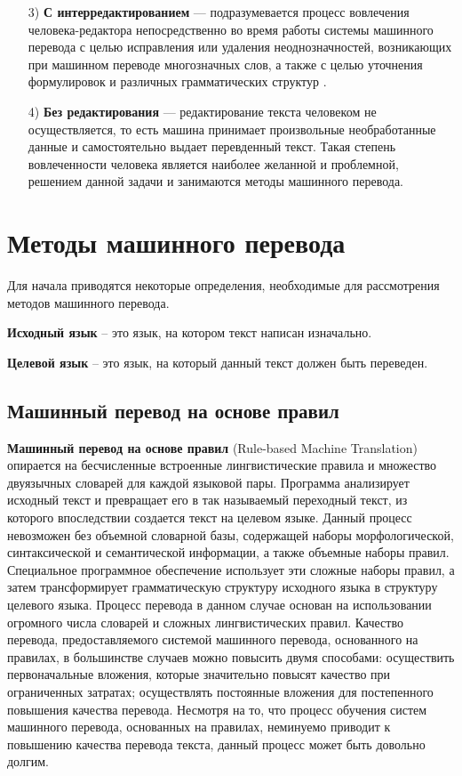 \begin{enumerate}
\begin{itemize}
    \item[3)] \textbf{С интерредактированием} --- подразумевается процесс вовлечения человека-редактора непосредственно во время работы системы машинного перевода с целью исправления или удаления неоднозначностей, возникающих при машинном переводе многозначных слов, а также с целью уточнения формулировок и различных грамматических структур \cite{batuev}.

    \item[4)] \textbf{Без редактирования} --- редактирование текста человеком не осуществляется, то есть машина принимает произвольные необработанные данные и самостоятельно выдает перевденный текст. 
    Такая степень вовлеченности человека является наиболее желанной и проблемной, решением данной задачи и занимаются методы машинного перевода.
\end{itemize}

\end{enumerate}

\section{Методы машинного перевода}

Для начала приводятся некоторые определения, необходимые для рассмотрения методов машинного перевода.

\textbf{Исходный язык} – это язык, на котором текст
написан изначально. 

\textbf{Целевой язык} – это язык, на который данный текст должен быть переведен. 

\subsection{Машинный перевод на основе правил}

\textbf{Машинный перевод на основе правил} (Rule-based Machine Translation) опирается на бесчисленные встроенные лингвистические правила и множество двуязычных словарей для каждой языковой пары. 
Программа анализирует исходный текст и превращает его в так называемый переходный текст, из которого впоследствии создается текст на целевом языке. 
Данный процесс невозможен без объемной словарной базы, содержащей наборы морфологической, синтаксической и семантической информации, а также
объемные наборы правил. 
Специальное программное обеспечение использует эти сложные наборы правил, а затем трансформирует грамматическую структуру исходного языка в структуру
целевого языка.
Процесс перевода в данном случае основан на использовании огромного числа словарей и сложных лингвистических правил. 
Качество перевода, предоставляемого системой машинного перевода, основанного на правилах, в большинстве случаев можно повысить двумя
способами: осуществить первоначальные вложения, которые значительно повысят качество при ограниченных затратах; осуществлять постоянные вложения для постепенного повышения качества перевода. 
Несмотря на то, что процесс обучения систем машинного перевода, основанных на правилах, неминуемо приводит к повышению качества перевода текста, данный процесс может быть довольно долгим.

